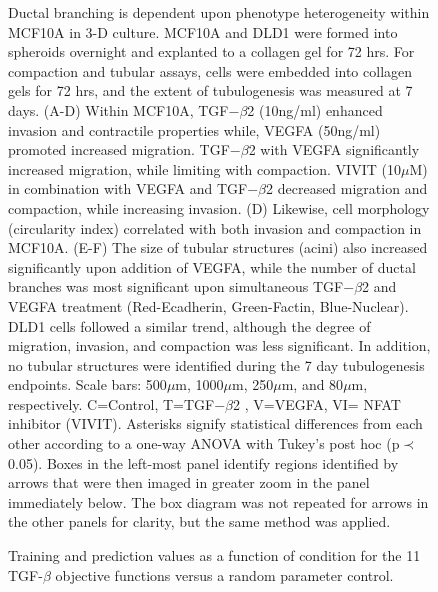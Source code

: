 \documentclass[11pt,letterpaper]{article}
\begin{document}
\begin{figure}
\caption{Ductal branching is dependent upon phenotype heterogeneity within MCF10A in 3-D culture.  MCF10A and DLD1 were formed into spheroids overnight and explanted to a collagen gel for 72 hrs.  For compaction and tubular assays, cells were embedded into collagen gels for 72 hrs, and the extent of tubulogenesis was measured at 7 days.  (A-D) Within MCF10A, TGF$-\beta$2 (10ng/ml) enhanced invasion and contractile properties while, VEGFA (50ng/ml) promoted increased migration.  TGF$-\beta$2 with VEGFA significantly increased migration, while limiting with compaction.  VIVIT (10$\mu$M) in combination with VEGFA and TGF$-\beta$2 decreased migration and compaction, while increasing invasion.  (D) Likewise, cell morphology (circularity index) correlated with both invasion and compaction in MCF10A.  (E-F) The size of tubular structures (acini) also increased significantly upon addition of VEGFA, while the number of ductal branches was most significant upon simultaneous TGF$-\beta$2 and VEGFA treatment (Red-Ecadherin, Green-Factin, Blue-Nuclear).   DLD1 cells followed a similar trend, although the degree of migration, invasion, and compaction was less significant.  In addition, no tubular structures were identified during the 7 day tubulogenesis endpoints.  Scale bars: 500$\mu$m, 1000$\mu$m, 250$\mu$m, and 80$\mu$m, respectively.  C=Control, T=TGF$-\beta$2 , V=VEGFA, VI= NFAT inhibitor (VIVIT).  Asterisks signify statistical differences from each other according to a one-way ANOVA with Tukey's post hoc (p$\prec$0.05).
Boxes in the left-most panel identify regions identified by arrows that were then imaged in greater zoom in the panel immediately below.
The box diagram was not repeated for arrows in the other panels for clarity, but the same method was applied.}\label{fg:F6}
\end{figure}

\clearpage

\renewcommand\thefigure{S\arabic{figure}}
\renewcommand\thetable{T\arabic{table}}
\renewcommand\thepage{S-\arabic{page}}
\renewcommand\theequation{S\arabic{equation}}

\setcounter{equation}{0}
\setcounter{table}{0}
\setcounter{figure}{0}
\setcounter{page}{1}

\clearpage

\begin{figure}
	\caption{Training and prediction values as a function of condition for the 11 TGF-$\beta$ objective functions versus a random parameter control.}\label{fg:ObjTable}
\end{figure}
\end{document}
